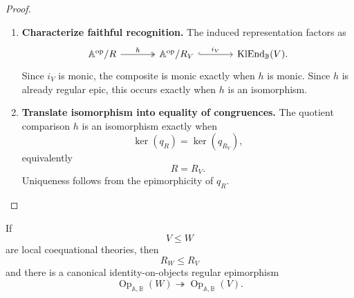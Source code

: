 \begin{proof}
\begin{enumerate}
        \item \textbf{Characterize faithful recognition.}
        The induced representation factors as
        \[
        \begin{tikzcd}[column sep=large]
            \mathbb A^{\mathrm{op}}/R
                \arrow[r, two heads, "h"]
            &
            \mathbb A^{\mathrm{op}}/R_V
                \arrow[r, hook, "i_V"]
            &
            \operatorname{KlEnd}_{\mathbb B}(V).
        \end{tikzcd}
        \]
        Since \(i_V\) is monic, the composite is monic exactly when \(h\) is
        monic. Since \(h\) is already regular epic, this occurs exactly when
        \(h\) is an isomorphism.

        \item \textbf{Translate isomorphism into equality of congruences.}
        The quotient comparison \(h\) is an isomorphism exactly when
        \[
            \ker(q_R)=\ker(q_{R_V}),
        \]
        equivalently
        \[
            R=R_V.
        \]
        Uniqueness follows from the epimorphicity of \(q_R\).
    \end{enumerate}
\end{proof}

\begin{proposition}
\label{prop:to-op-contravariance}
    If
    \[
        V\leq W
    \]
    are local coequational theories, then
    \[
        R_W\leq R_V
    \]
    and there is a canonical identity-on-objects regular epimorphism
    \[
        \operatorname{Op}_{\mathbb A,\mathbb B}(W)
        \twoheadrightarrow
        \operatorname{Op}_{\mathbb A,\mathbb B}(V).
    \]
\end{proposition}

